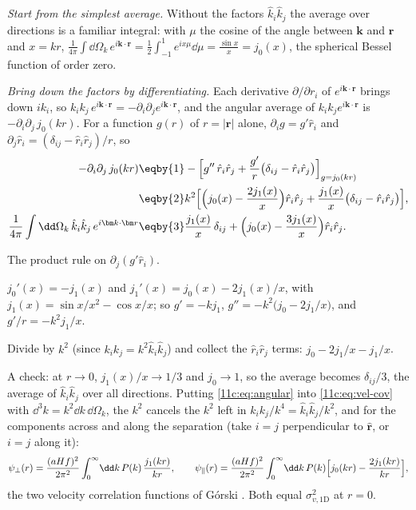 \emph{Start from the simplest average.} Without the factors $\hat k_i\hat k_j$ the
average over directions is a familiar integral: with $\mu$ the cosine of the angle
between $\bm k$ and $\bm r$ and $x=kr$,
$\frac{1}{4\pi}\int\dd\Omega_k\,e^{i\bm k\cdot\bm r}=\frac12\int_{-1}^1e^{ix\mu}\dd\mu
=\frac{\sin x}{x}=j_0(x)$, the spherical Bessel function of order zero.

\emph{Bring down the factors by differentiating.} Each derivative $\partial/\partial r_i$
of $e^{i\bm k\cdot\bm r}$ brings down $ik_i$, so $k_ik_j\,e^{i\bm k\cdot\bm r}=
-\partial_i\partial_je^{i\bm k\cdot\bm r}$, and the angular average of $k_ik_je^{i\bm k\cdot\bm r}$
is $-\partial_i\partial_j\,j_0(kr)$. For a function $g(r)$ of $r=|\bm r|$ alone,
$\partial_ig=g'\hat r_i$ and $\partial_j\hat r_i=(\delta_{ij}-\hat r_i\hat r_j)/r$, so
\begin{align}
  -\partial_i\partial_j\,j_0(kr)
  &\eqby{1}-\Bigl[g''\,\hat r_i\hat r_j+\frac{g'}{r}\bigl(\delta_{ij}-\hat r_i\hat r_j\bigr)\Bigr]_{g=j_0(kr)}
  \nonumber\\
  &\eqby{2}k^2\Bigl[\Bigl(j_0(x)-\frac{2j_1(x)}{x}\Bigr)\hat r_i\hat r_j
   +\frac{j_1(x)}{x}\bigl(\delta_{ij}-\hat r_i\hat r_j\bigr)\Bigr],
  \nonumber\\
  \frac{1}{4\pi}\int\dd\Omega_k\,\hat k_i\hat k_j\,e^{i\bm k\cdot\bm r}
  &\eqby{3}\frac{j_1(x)}{x}\,\delta_{ij}+\Bigl(j_0(x)-\frac{3j_1(x)}{x}\Bigr)\hat r_i\hat r_j .
  \label{11c:eq:angular}
\end{align}
\begin{explain}
  \item The product rule on $\partial_j(g'\hat r_i)$.
  \item $j_0'(x)=-j_1(x)$ and $j_1'(x)=j_0(x)-2j_1(x)/x$, with
        $j_1(x)=\sin x/x^2-\cos x/x$; so $g'=-kj_1$, $g''=-k^2\bigl(j_0-2j_1/x\bigr)$, and
        $g'/r=-k^2j_1/x$.
  \item Divide by $k^2$ (since $k_ik_j=k^2\hat k_i\hat k_j$) and collect the
        $\hat r_i\hat r_j$ terms: $j_0-2j_1/x-j_1/x$.
\end{explain}
A check: at $r\to0$, $j_1(x)/x\to1/3$ and $j_0\to1$, so the average becomes
$\delta_{ij}/3$, the average of $\hat k_i\hat k_j$ over all directions. Putting
\eqref{11c:eq:angular} into \eqref{11c:eq:vel-cov} with $\dd^3k=k^2\dd k\,\dd\Omega_k$, the
$k^2$ cancels the $k^2$ left in $k_ik_j/k^4=\hat k_i\hat k_j/k^2$, and for the
components across and along the separation (take $i=j$ perpendicular to $\hat{\bm r}$,
or $i=j$ along it):
\begin{equation}
  \psi_\perp(r)=\frac{(aHf)^2}{2\pi^2}\int_0^\infty\!\dd k\,P(k)\,\frac{j_1(kr)}{kr},
  \qquad
  \psi_\parallel(r)=\frac{(aHf)^2}{2\pi^2}\int_0^\infty\!\dd k\,P(k)
  \Bigl[j_0(kr)-\frac{2j_1(kr)}{kr}\Bigr],
  \label{11c:eq:psi}
\end{equation}
the two velocity correlation functions of G\'orski \cite{Gorski1988}. Both equal
$\sigma_{v,1\mathrm D}^2$ at $r=0$.

